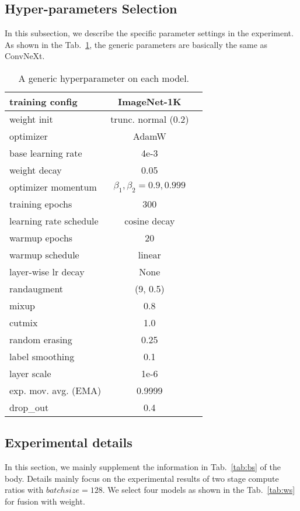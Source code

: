 \documentclass[10pt,twocolumn,letterpaper]{article}
\begin{document}
\subsection{Hyper-parameters Selection}
\label{app:hyper-parameters-select}
In this subsection, we describe the specific parameter settings in the experiment. As shown in the Tab.~\ref{tab:train_detail}, the generic parameters are basically the same as ConvNeXt. 
\begin{table}[htbp]
  \centering
  \caption{A generic hyperparameter on each model.}
    \begin{tabular}{l|cc}
    \toprule
    training config & ImageNet-1K \\
    \midrule
    weight init & trunc. normal (0.2) \\
    optimizer & AdamW\\
    base learning rate & 4e-3 \\
    weight decay & 0.05  \\
    optimizer momentum & $\beta_1, \beta_2{=}0.9, 0.999$\\
    training epochs & 300\\
    learning rate schedule & cosine decay\\
    warmup epochs & 20\\
    warmup schedule & linear\\
    layer-wise lr decay & None \\
    randaugment & (9, 0.5)\\
    mixup & 0.8\\
    cutmix & 1.0 \\
    random erasing & 0.25\\
    label smoothing & 0.1\\
    layer scale & 1e-6\\
    exp. mov. avg. (EMA) & 0.9999\\
    drop\_out & 0.4\\
    \bottomrule
    \end{tabular}\label{tab:train_detail}\vspace{-1em}
\end{table}%
\subsection{Experimental details}
\label{app:Multi-stream result setting}
In this section, we mainly supplement the information in Tab.~\ref{tab:bs} of the body. Details mainly focus on the experimental results of two stage compute ratios with $batchsize=128$. We select four models as shown in the Tab.~\ref{tab:ws} for fusion with weight. 
\end{document}
